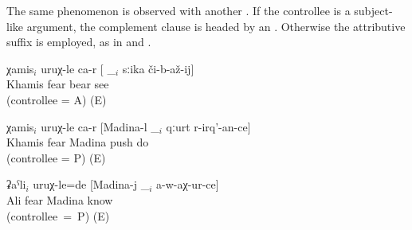 The same phenomenon is observed with another   . If the controllee is a subject-like argument, the complement clause is headed by an  . Otherwise the attributive suffix  is employed, as in  and .
%
\begin{exe}
	\ex	\label{ex:Khamis, bears, Madina, Ali@46}
	\begin{xlist}
		\ex	\label{ex:Khamis fears to see the bear@46a}
		\gll	χamis$_{i}$	uruχ-le ca-r	[ \_$_{i}$	sːika	či-b-až-ij]\\
			Khamis	fear 	{} 	bear	see\\
		\glt	{} (controllee = A) (E)

		\ex	\label{ex:Khamis fears that Madina pushes her@46b}
		\gll	χamis$_{i}$	uruχ-le ca-r	[Madina-l	\_$_{i}$	qːurt	r-irq'-an-ce]\\
			Khamis	fear 	Madina		push	do\\
		\glt	{} (controllee = P) (E)

		\ex	\label{ex:Ali feared that Madina would not recognize / know him@46c}
		\gll	ʡaˁli$_{i}$	uruχ-le=de	[Madina-j	\_$_{i}$	a-w-aχ-ur-ce]\\
			Ali	fear	Madina		know\\
		\glt	{}  (controllee~=~P) (E)
	\end{xlist}
\end{exe}

